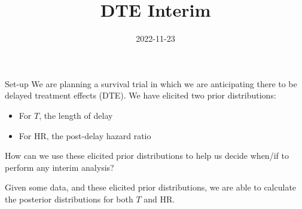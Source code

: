 \documentclass[
  ignorenonframetext,
]{beamer}
\title{DTE Interim}
\author{}
\date{\vspace{-2.5em}2022-11-23}
\providecommand{\tightlist}{%
  \setlength{\itemsep}{0pt}\setlength{\parskip}{0pt}}
\begin{document}
\frame{\titlepage}

\begin{frame}{Set-up}
\protect\hypertarget{set-up}{}
We are planning a survival trial in which we are anticipating there to
be delayed treatment effects (DTE). We have elicited two prior
distributions:

\begin{itemize}
\tightlist
\item
  For \(T\), the length of delay
\item
  For HR, the post-delay hazard ratio
\end{itemize}

How can we use these elicited prior distributions to help us decide
when/if to perform any interim analysis?

Given some data, and these elicited prior distributions, we are able to
calculate the posterior distributions for both \(T\) and HR.
\end{frame}
\end{document}
